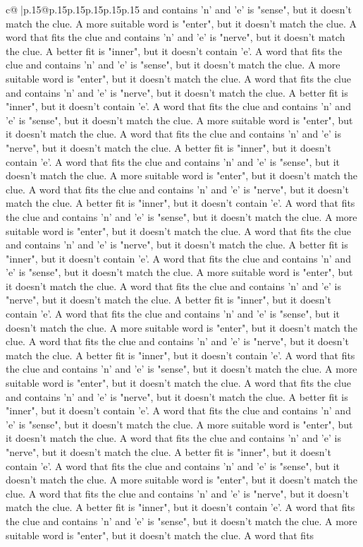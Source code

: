 \documentclass{article}
\begin{document}
{\begin{supertabular}{c@{$\;$}|p{.15\linewidth}@{}p{.15\linewidth}p{.15\linewidth}p{.15\linewidth}p{.15\linewidth}p{.15\linewidth}}
{{{and contains 'n' and 'e' is "sense", but it doesn't match the clue. A more suitable word is "enter", but it doesn't match the clue. A word that fits the clue and contains 'n' and 'e' is "nerve", but it doesn't match the clue. A better fit is "inner", but it doesn't contain 'e'. A word that fits the clue and contains 'n' and 'e' is "sense", but it doesn't match the clue. A more suitable word is "enter", but it doesn't match the clue. A word that fits the clue and contains 'n' and 'e' is "nerve", but it doesn't match the clue. A better fit is "inner", but it doesn't contain 'e'. A word that fits the clue and contains 'n' and 'e' is "sense", but it doesn't match the clue. A more suitable word is "enter", but it doesn't match the clue. A word that fits the clue and contains 'n' and 'e' is "nerve", but it doesn't match the clue. A better fit is "inner", but it doesn't contain 'e'. A word that fits the clue and contains 'n' and 'e' is "sense", but it doesn't match the clue. A more suitable word is "enter", but it doesn't match the clue. A word that fits the clue and contains 'n' and 'e' is "nerve", but it doesn't match the clue. A better fit is "inner", but it doesn't contain 'e'. A word that fits the clue and contains 'n' and 'e' is "sense", but it doesn't match the clue. A more suitable word is "enter", but it doesn't match the clue. A word that fits the clue and contains 'n' and 'e' is "nerve", but it doesn't match the clue. A better fit is "inner", but it doesn't contain 'e'. A word that fits the clue and contains 'n' and 'e' is "sense", but it doesn't match the clue. A more suitable word is "enter", but it doesn't match the clue. A word that fits the clue and contains 'n' and 'e' is "nerve", but it doesn't match the clue. A better fit is "inner", but it doesn't contain 'e'. A word that fits the clue and contains 'n' and 'e' is "sense", but it doesn't match the clue. A more suitable word is "enter", but it doesn't match the clue. A word that fits the clue and contains 'n' and 'e' is "nerve", but it doesn't match the clue. A better fit is "inner", but it doesn't contain 'e'. A word that fits the clue and contains 'n' and 'e' is "sense", but it doesn't match the clue. A more suitable word is "enter", but it doesn't match the clue. A word that fits the clue and contains 'n' and 'e' is "nerve", but it doesn't match the clue. A better fit is "inner", but it doesn't contain 'e'. A word that fits the clue and contains 'n' and 'e' is "sense", but it doesn't match the clue. A more suitable word is "enter", but it doesn't match the clue. A word that fits the clue and contains 'n' and 'e' is "nerve", but it doesn't match the clue. A better fit is "inner", but it doesn't contain 'e'. A word that fits the clue and contains 'n' and 'e' is "sense", but it doesn't match the clue. A more suitable word is "enter", but it doesn't match the clue. A word that fits the clue and contains 'n' and 'e' is "nerve", but it doesn't match the clue. A better fit is "inner", but it doesn't contain 'e'. A word that fits the clue and contains 'n' and 'e' is "sense", but it doesn't match the clue. A more suitable word is "enter", but it doesn't match the clue. A word that fits }}}
\end{supertabular}}
\end{document}
